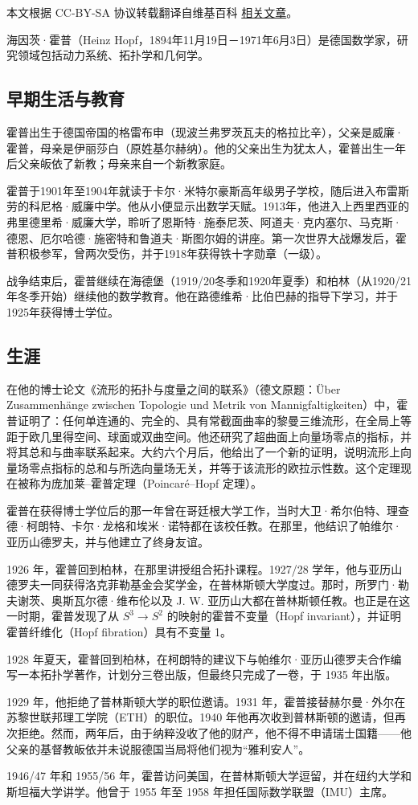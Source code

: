 
本文根据 CC-BY-SA 协议转载翻译自维基百科 \href{https://en.wikipedia.org/wiki/Heinz_Hopf}{相关文章}。

海因茨·霍普（Heinz Hopf，1894年11月19日－1971年6月3日）是德国数学家，研究领域包括动力系统、拓扑学和几何学。
\subsection{早期生活与教育}
霍普出生于德国帝国的格雷布申（现波兰弗罗茨瓦夫的格拉比辛），父亲是威廉·霍普，母亲是伊丽莎白（原姓基尔赫纳）。他的父亲出生为犹太人，霍普出生一年后父亲皈依了新教；母亲来自一个新教家庭。

霍普于1901年至1904年就读于卡尔·米特尔豪斯高年级男子学校，随后进入布雷斯劳的科尼格·威廉中学。他从小便显示出数学天赋。1913年，他进入上西里西亚的弗里德里希·威廉大学，聆听了恩斯特·施泰尼茨、阿道夫·克内塞尔、马克斯·德恩、厄尔哈德·施密特和鲁道夫·斯图尔姆的讲座。第一次世界大战爆发后，霍普积极参军，曾两次受伤，并于1918年获得铁十字勋章（一级）。

战争结束后，霍普继续在海德堡（1919/20冬季和1920年夏季）和柏林（从1920/21年冬季开始）继续他的数学教育。他在路德维希·比伯巴赫的指导下学习，并于1925年获得博士学位。
\subsection{生涯}
在他的博士论文《流形的拓扑与度量之间的联系》（德文原题：Über Zusammenhänge zwischen Topologie und Metrik von Mannigfaltigkeiten）中，霍普证明了：任何单连通的、完全的、具有常截面曲率的黎曼三维流形，在全局上等距于欧几里得空间、球面或双曲空间。他还研究了超曲面上向量场零点的指标，并将其总和与曲率联系起来。大约六个月后，他给出了一个新的证明，说明流形上向量场零点指标的总和与所选向量场无关，并等于该流形的欧拉示性数。这个定理现在被称为庞加莱–霍普定理（Poincaré–Hopf 定理）。

霍普在获得博士学位后的那一年曾在哥廷根大学工作，当时大卫·希尔伯特、理查德·柯朗特、卡尔·龙格和埃米·诺特都在该校任教。在那里，他结识了帕维尔·亚历山德罗夫，并与他建立了终身友谊。

1926 年，霍普回到柏林，在那里讲授组合拓扑课程。1927/28 学年，他与亚历山德罗夫一同获得洛克菲勒基金会奖学金，在普林斯顿大学度过。那时，所罗门·勒夫谢茨、奥斯瓦尔德·维布伦以及 J. W. 亚历山大都在普林斯顿任教。也正是在这一时期，霍普发现了从
$S^3 \to S^2$ 的映射的霍普不变量（Hopf invariant），并证明霍普纤维化（Hopf fibration）具有不变量 1。

1928 年夏天，霍普回到柏林，在柯朗特的建议下与帕维尔·亚历山德罗夫合作编写一本拓扑学著作，计划分三卷出版，但最终只完成了一卷，于 1935 年出版。

1929 年，他拒绝了普林斯顿大学的职位邀请。1931 年，霍普接替赫尔曼·外尔在苏黎世联邦理工学院（ETH）的职位。1940 年他再次收到普林斯顿的邀请，但再次拒绝。然而，两年后，由于纳粹没收了他的财产，他不得不申请瑞士国籍——他父亲的基督教皈依并未说服德国当局将他们视为“雅利安人”。

1946/47 年和 1955/56 年，霍普访问美国，在普林斯顿大学逗留，并在纽约大学和斯坦福大学讲学。他曾于 1955 年至 1958 年担任国际数学联盟（IMU）主席。
